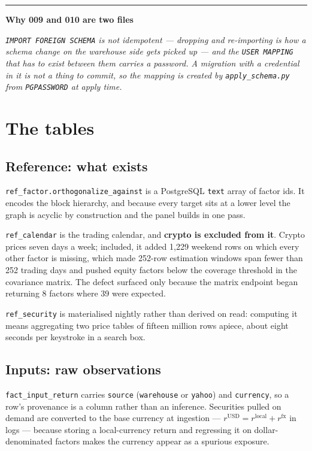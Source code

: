 \documentclass[11pt,a4paper]{article}
\newcommand{\code}[1]{\texttt{\small #1}}
\newenvironment{designnote}[1]
  {\par\vspace{1.6ex}%
   \begin{lrbox}{\notebox}\begin{minipage}{\textwidth}%
   {\color{rule}\rule{\textwidth}{0.4pt}}\par\vspace{0.7ex}
   {\small\sffamily\bfseries\color{navy}#1}\par\vspace{0.35ex}
   \small\itshape}
  {\par\vspace{0.7ex}\noindent{\color{rule}\rule{\textwidth}{0.4pt}}%
   \end{minipage}\end{lrbox}%
   \noindent\usebox{\notebox}\par\vspace{1.6ex}}
\begin{document}
\begin{designnote}{Why 009 and 010 are two files}
\code{IMPORT FOREIGN SCHEMA} is not idempotent --- dropping and re-importing is how
a schema change on the warehouse side gets picked up --- and the \code{USER MAPPING}
that has to exist between them carries a password. A migration with a credential in
it is not a thing to commit, so the mapping is created by \code{apply\_schema.py}
from \code{PGPASSWORD} at apply time.
\end{designnote}

\section{The tables}

\schemaInventory{}

\subsection{Reference: what exists}

\code{ref\_factor.orthogonalize\_against} is a PostgreSQL \code{text} array of
factor ids. It
encodes the block hierarchy, and because every target sits at a lower level the
graph is acyclic by construction and the panel builds in one pass.

\code{ref\_calendar} is the trading calendar, and \textbf{crypto is excluded from
it}. Crypto prices seven days a week; included, it added 1{,}229 weekend rows on
which every other factor is missing, which made 252-row estimation windows span
fewer than 252 trading days and pushed equity factors below the coverage threshold
in the covariance matrix. The defect surfaced only because the matrix endpoint
began returning 8 factors where 39 were expected.

\code{ref\_security} is materialised nightly rather than derived on read: computing
it means aggregating two price tables of fifteen million rows apiece, about eight
seconds per keystroke in a search box.

\subsection{Inputs: raw observations}

\code{fact\_input\_return} carries \code{source} (\code{warehouse} or
\code{yahoo}) and \code{currency}, so a row's provenance is a column rather than an
inference. Securities pulled on demand are converted to the base currency at
ingestion --- $r^{\mathrm{USD}} = r^{\mathrm{local}} + r^{\mathrm{fx}}$ in logs ---
because storing a local-currency return and regressing it on dollar-denominated
factors makes the currency appear as a spurious exposure.
\end{document}
